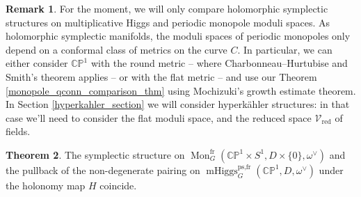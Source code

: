 \documentclass[11pt, oneside, reqno]{amsart}
\theoremstyle{definition} \newtheorem{definition}{Definition}[section]
\newtheorem{theorem}[definition]{Theorem}
\theoremstyle{definition} \newtheorem{remark}[definition]{Remark}
\theoremstyle{definition} \newtheorem{remarks}[definition]{Remarks}
\theoremstyle{definition} \newtheorem{question}[definition]{Question}
\theoremstyle{definition} \newtheorem*{note}{Note}
\theoremstyle{definition} \newtheorem{example}[definition]{Example}
\theoremstyle{definition} \newtheorem{examples}[definition]{Examples}
\newcommand{\bb}[1]{\mathbb{#1}}
\newcommand{\mc}[1]{\mathcal{#1}}
\DeclareMathOperator{\mhiggs}{mHiggs}
\DeclareMathOperator{\mon}{Mon}
\newcommand{\fr}{\mathrm{fr}}
\newcommand{\red}{\mathrm{red}}
\begin{document}
\begin{remark}
For the moment, we will only compare holomorphic symplectic structures on multiplicative Higgs and periodic monopole moduli spaces.  As holomorphic symplectic manifolds, the moduli spaces of periodic monopoles only depend on a conformal class of metrics on the curve $C$.  In particular, we can either consider $\bb{CP}^1$ with the round metric -- where Charbonneau--Hurtubise and Smith's theorem applies -- or with the flat metric -- and use our Theorem \ref{monopole_qconn_comparison_thm} using Mochizuki's growth estimate theorem.  In Section \ref{hyperkahler_section} we will consider hyperk\"ahler structures: in that case we'll need to consider the flat moduli space, and the reduced space $\mc V_{\red}$ of fields.
\end{remark}

\begin{theorem} \label{symplectic_comparison_thm}
The symplectic structure on $\mon_G^\fr(\bb{CP}^1 \times S^1,D \times\{0\},\omega^\vee)$ and the pullback of the non-degenerate pairing on $\mhiggs_G^{\text{ps,fr}}(\bb{CP}^1,D,\omega^\vee)$ under the holonomy map $H$ coincide.
\end{theorem}
\end{document}
